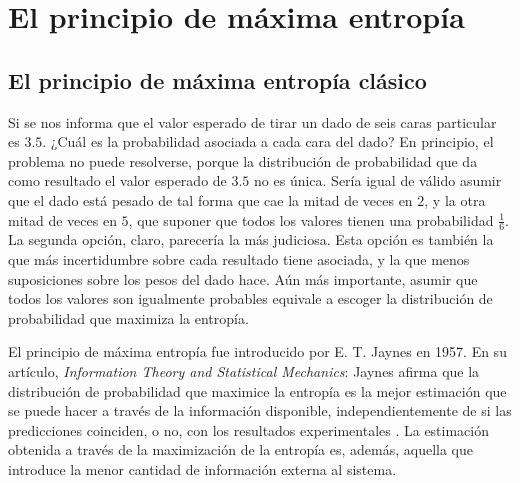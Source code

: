 \section{El principio de máxima entropía}\label{sec:CH1MaxEnt}



\subsection{El principio de máxima entropía clásico}

Si se nos informa que el valor esperado de tirar un dado de seis caras particular es $3.5$. ¿Cuál es la probabilidad asociada a cada cara del dado? En principio, el problema no puede resolverse, porque la distribución de probabilidad que da como resultado el valor esperado de $3.5$ no es única. Sería igual de válido asumir que el dado está pesado de tal forma que cae la mitad de veces en $2$, y la otra mitad de veces en $5$, que suponer que todos los valores tienen una probabilidad $\frac{1}{6}$. La segunda opción, claro, parecería la más judiciosa. Esta opción es también la que más incertidumbre sobre cada resultado tiene asociada, y la que menos suposiciones sobre los pesos del dado hace. Aún más importante, asumir que todos los valores son igualmente probables equivale a escoger la distribución de probabilidad que maximiza la entropía.

El principio de máxima entropía fue introducido por E. T. Jaynes en 1957. En su artículo, \textit{Information Theory and Statistical Mechanics}: Jaynes afirma que la distribución de probabilidad que maximice la entropía es la mejor estimación que se puede hacer a través de la información disponible, independientemente de si las predicciones coinciden, o no, con los resultados experimentales \cite{JaynesI} . La estimación obtenida a través de la maximización de la entropía es, además, aquella que introduce la menor cantidad de información externa al sistema.


